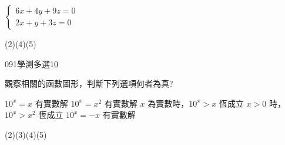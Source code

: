 \begin{QUESTIONS}
\begin{QUESTION}
\begin{QBODY}
\begin{QOPS}
                \QOP
                $\left\{ \begin{array}{l} 6x+4y+9z=0 \\ 2x+y+3z =0 \end{array}\right.$
            \end{QOPS}
        \end{QBODY}
        \begin{QFROMS}
        \end{QFROMS}
        \begin{QTAGS}\end{QTAGS}
        \begin{QANS}
            (2)(4)(5)
        \end{QANS}
        \begin{QSOLLIST}
        \end{QSOLLIST}
        \begin{QEMPTYSPACE}
        \end{QEMPTYSPACE}
    \end{QUESTION}
    \begin{QUESTION}
        \begin{ExamInfo}{091}{學測}{多選}{10}
        \end{ExamInfo}
        \begin{ExamAnsRateInfo}{20}{40}{11}{9}
        \end{ExamAnsRateInfo}
        \begin{QBODY}
            觀察相關的函數圖形，判斷下列選項何者為真?
            \begin{QOPS}
                \QOP $10^x=x$ 有實數解 
                \QOP $10^x=x^2$ 有實數解 
                \QOP $x$ 為實數時，$10^x>x$ 恆成立 
                \QOP $x>0$ 時，$10^x>x^2$ 恆成立 
                \QOP $10^x= -x$ 有實數解
            \end{QOPS}
        \end{QBODY}
        \begin{QFROMS}
        \end{QFROMS}
        \begin{QTAGS}\end{QTAGS}
        \begin{QANS}
            (2)(3)(4)(5)
        \end{QANS}
        \begin{QSOLLIST}
        \end{QSOLLIST}
        \begin{QEMPTYSPACE}
        \end{QEMPTYSPACE}

\end{QUESTION}
\end{QUESTIONS}
